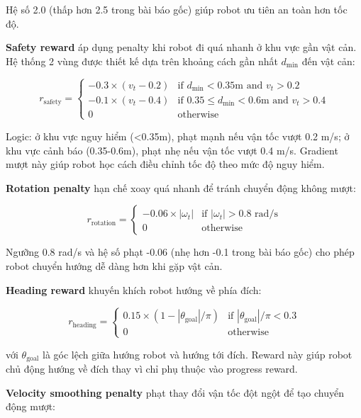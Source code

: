 Hệ số 2.0 (thấp hơn 2.5 trong bài báo gốc) giúp robot ưu tiên an toàn hơn tốc độ.

\textbf{Safety reward} áp dụng penalty khi robot đi quá nhanh ở khu vực gần vật cản. Hệ thống 2 vùng được thiết kế dựa trên khoảng cách gần nhất $d_{\min}$ đến vật cản:

\begin{equation}
r_{\text{safety}} = \begin{cases}
-0.3 \times (v_t - 0.2) & \text{if } d_{\min} < 0.35\text{m and } v_t > 0.2\\
-0.1 \times (v_t - 0.4) & \text{if } 0.35 \leq d_{\min} < 0.6\text{m and } v_t > 0.4\\
0 & \text{otherwise}
\end{cases}
\end{equation}

Logic: ở khu vực nguy hiểm (<0.35m), phạt mạnh nếu vận tốc vượt 0.2 m/s; ở khu vực cảnh báo (0.35-0.6m), phạt nhẹ nếu vận tốc vượt 0.4 m/s. Gradient mượt này giúp robot học cách điều chỉnh tốc độ theo mức độ nguy hiểm.

\textbf{Rotation penalty} hạn chế xoay quá nhanh để tránh chuyển động không mượt:

\begin{equation}
r_{\text{rotation}} = \begin{cases}
-0.06 \times |\omega_t| & \text{if } |\omega_t| > 0.8 \text{ rad/s}\\
0 & \text{otherwise}
\end{cases}
\end{equation}

Ngưỡng 0.8 rad/s và hệ số phạt -0.06 (nhẹ hơn -0.1 trong bài báo gốc) cho phép robot chuyển hướng dễ dàng hơn khi gặp vật cản.

\textbf{Heading reward} khuyến khích robot hướng về phía đích:

\begin{equation}
r_{\text{heading}} = \begin{cases}
0.15 \times (1 - |\theta_{\text{goal}}|/\pi) & \text{if } |\theta_{\text{goal}}|/\pi < 0.3\\
0 & \text{otherwise}
\end{cases}
\end{equation}

với $\theta_{\text{goal}}$ là góc lệch giữa hướng robot và hướng tới đích. Reward này giúp robot chủ động hướng về đích thay vì chỉ phụ thuộc vào progress reward.

\textbf{Velocity smoothing penalty} phạt thay đổi vận tốc đột ngột để tạo chuyển động mượt:

